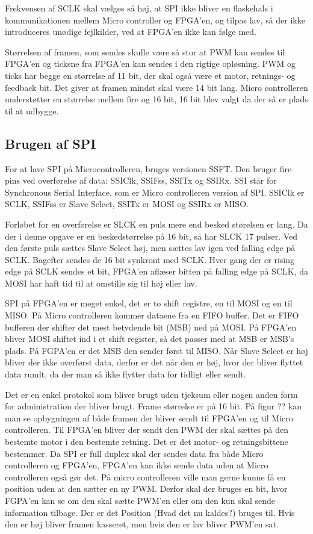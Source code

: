 Frekvensen af SCLK skal vælges så høj, at SPI ikke bliver en flaskehals i kommunikationen mellem Micro controller og FPGA’en, og tilpas lav, så der ikke introduceres unødige fejlkilder, ved at FPGA’en ikke kan følge med.

Størrelsen af framen, som sendes skulle være så stor at PWM kan sendes til FPGA’en og ticksne fra FPGA’en kan sendes i den rigtige opløsning. PWM og ticks har begge en størrelse af 11 bit, der skal også være et motor, retnings- og feedback bit.  Det giver at framen mindst skal være 14 bit lang. Micro controlleren understøtter en størrelse mellem fire og 16 bit, 16 bit blev valgt da der så er plads til at udbygge.



\subsection{Brugen af SPI}

For at lave SPI på Microcontrolleren, bruges versionen SSFT. Den bruger fire pins ved overførelse af data: SSIClk, SSIFss, SSITx og SSIRx. SSI står for Synchronous Serial Interface, som er Micro controlleren version af SPI. SSIClk er SCLK, SSIFss er Slave Select, SSITx er MOSI og SSIRx er MISO.

Forløbet for en overførelse er SLCK en puls mere end besked størelsen er lang. Da der i denne opgave er en beskedstørrelse på 16 bit, så har SLCK 17 pulser. Ved den første puls sættes Slave Select høj, men sættes lav igen ved falling edge på SCLK. Bagefter sendes de 16 bit synkront med SCLK. Hver gang der er rising edge på SCLK sendes et bit, FPGA’en aflæser bitten på falling edge på SCLK, da MOSI har haft tid til at omstille sig til høj eller lav.

SPI på FPGA’en er meget enkel, det er to shift registre, en til MOSI og en til MISO. På Micro controlleren kommer dataene fra en FIFO buffer. Det er FIFO bufferen der shifter det mest betydende bit (MSB) ned på MOSI. På FPGA’en bliver MOSI shiftet ind i et shift register, så det passer med at MSB er MSB’s plads. På FGPA’en er det MSB den sender først til MISO. Når Slave Select er høj bliver der ikke overførst data, derfor er det når den er høj, hvor der bliver flyttet data rundt, da der man så ikke flytter data for tidligt eller sendt. 

Det er en enkel protokol som bliver brugt uden tjeksum eller nogen anden form for administration der bliver brugt. Frame størrelse er på 16 bit. På figur ?? kan man se opbygningen af både framen der bliver sendt til FPGA’en og til Micro controlleren. Til FPGA’en bliver der sendt den PWM der skal sættes på den bestemte motor i den bestemte retning. Det er det motor- og retningsbittene bestemmer. Da SPI er full duplex skal der sendes data fra både Micro controlleren og FPGA’en, FPGA’en kan ikke sende data uden at Micro controlleren også gør det. På micro controlleren ville man gerne kunne få en position uden at den sætter en ny PWM. Derfor skal der bruges en bit, hvor FGPA’en kan se om den skal sætte PWM’en eller om den kun skal sende information tilbage. Der er det Position (Hvad det nu kaldes?) bruges til. Hvis den er høj bliver framen kasseret, men hvis den er lav bliver PWM’en sat.  


